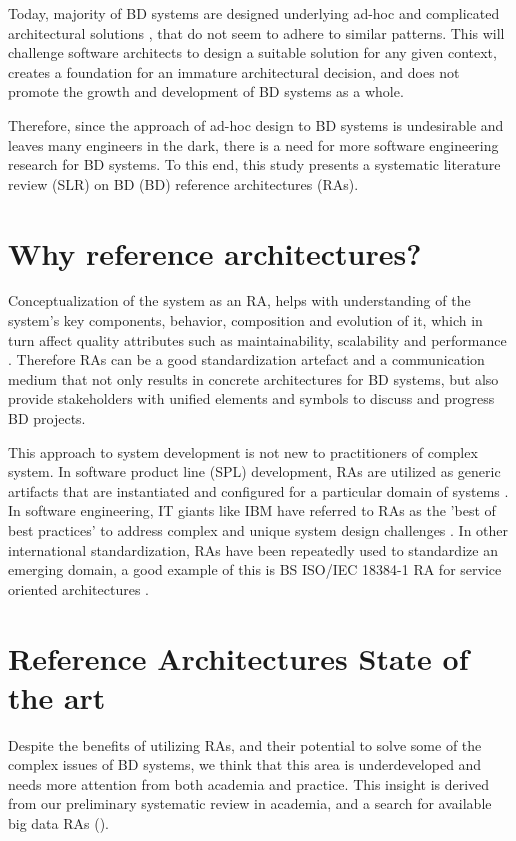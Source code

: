 \documentclass{ieeeaccess}
\begin{document}
Today, majority of BD systems are designed underlying ad-hoc and complicated architectural solutions \cite{Gorton}, that do not seem to adhere to similar patterns. This will challenge software architects to design a suitable solution for any given context, creates a foundation for an immature architectural decision, and does not promote the growth and development of BD systems as a whole. 

Therefore, since the approach of ad-hoc design to BD systems is undesirable and leaves many engineers in the dark, there is a need for more software engineering research for BD systems. To this end, this study presents a systematic literature review (SLR) on BD (BD) reference architectures (RAs). 

\section{Why reference architectures?}
Conceptualization of the system as an RA, helps with understanding of the system’s key components, behavior, composition and evolution of it, which in turn affect quality attributes such as maintainability, scalability and performance \cite{Cloutier}. Therefore RAs can be a good standardization artefact and a communication medium that not only results in concrete architectures for BD systems, but also provide stakeholders with unified elements and symbols to discuss and progress BD projects.

This approach to system development is not new to practitioners of complex system. In software product line (SPL) development, RAs are utilized as generic artifacts that are instantiated and configured for a particular domain of systems \cite{Derras}. In software engineering, IT giants like IBM have referred to RAs as the 'best of best practices' to address complex and unique system design challenges \cite{Cloutier}. In other international standardization, RAs have been repeatedly used to standardize an emerging domain, a good example of this is BS ISO/IEC 18384-1 RA for service oriented architectures \cite{Iso18384-1}. 

\section{Reference Architectures State of the art}

Despite the benefits of utilizing RAs, and their potential to solve some of the complex issues of BD systems, we think that this area is underdeveloped and needs more attention from both academia and practice. This insight is derived from our preliminary systematic review in academia, and a search for available big data RAs (\cite{AtaeiACIS}).
\end{document}

